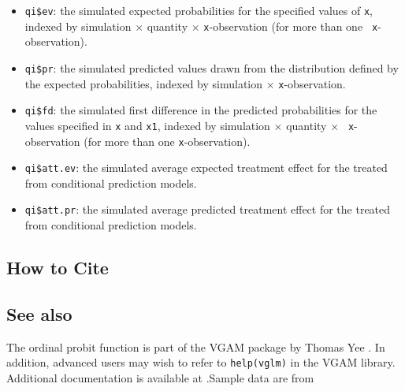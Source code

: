 \begin{itemize}
   \begin{itemize}
   \item {\tt qi\$ev}: the simulated expected probabilities for the
     specified values of {\tt x}, indexed by simulation $\times$
     quantity $\times$ {\tt x}-observation (for more than one {\tt
       x}-observation).
   \item {\tt qi\$pr}: the simulated predicted values drawn from the
     distribution defined by the expected probabilities, indexed by
     simulation $\times$ {\tt x}-observation.
   \item {\tt qi\$fd}: the simulated first difference in the predicted
     probabilities for the values specified in {\tt x} and {\tt x1},
     indexed by simulation $\times$ quantity $\times$ {\tt
       x}-observation (for more than one {\tt x}-observation).
   \item {\tt qi\$att.ev}: the simulated average expected treatment
     effect for the treated from conditional prediction models.  
   \item {\tt qi\$att.pr}: the simulated average predicted treatment
     effect for the treated from conditional prediction models.  
   \end{itemize}
\end{itemize}

\subsection*{How to Cite}


\subsection*{See also}
The ordinal probit function is part of the VGAM package by Thomas Yee \citep{YeeHas03}. In addition, advanced users may wish to refer to \texttt{help(vglm)} 
in the VGAM library.  Additional documentation is available at
.Sample data are from \cite{Martin92}
